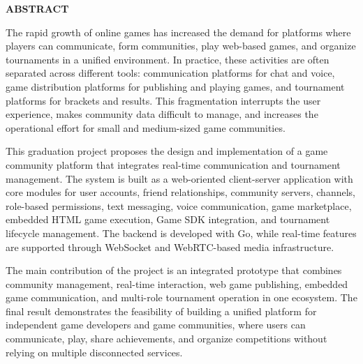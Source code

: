 \documentclass[../DoAn.tex]{subfiles}
\begin{document}
\begin{center}
    \Large{\textbf{ABSTRACT}}\\
\end{center}
\vspace{1cm}

The rapid growth of online games has increased the demand for platforms where players can communicate, form communities, play web-based games, and organize tournaments in a unified environment. In practice, these activities are often separated across different tools: communication platforms for chat and voice, game distribution platforms for publishing and playing games, and tournament platforms for brackets and results. This fragmentation interrupts the user experience, makes community data difficult to manage, and increases the operational effort for small and medium-sized game communities.

This graduation project proposes the design and implementation of a game community platform that integrates real-time communication and tournament management. The system is built as a web-oriented client-server application with core modules for user accounts, friend relationships, community servers, channels, role-based permissions, text messaging, voice communication, game marketplace, embedded HTML game execution, Game SDK integration, and tournament lifecycle management. The backend is developed with Go, while real-time features are supported through WebSocket and WebRTC-based media infrastructure.

The main contribution of the project is an integrated prototype that combines community management, real-time interaction, web game publishing, embedded game communication, and multi-role tournament operation in one ecosystem. The final result demonstrates the feasibility of building a unified platform for independent game developers and game communities, where users can communicate, play, share achievements, and organize competitions without relying on multiple disconnected services.
\end{document}
